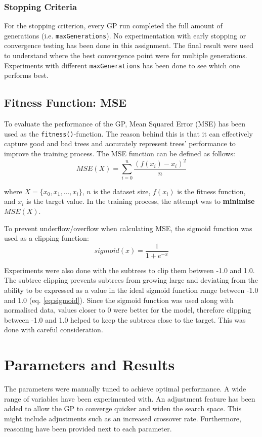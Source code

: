 \documentclass{article}
\begin{document}
\subsubsection{Stopping Criteria}
For the stopping criterion, every GP run completed the full amount of generations (i.e. \texttt{maxGenerations}). No experimentation with early stopping or convergence testing has been done in this assignment. The final result were used to understand where the best convergence point were for multiple generations. Experiments with different \texttt{maxGenerations} has been done to see which one performs best.

\subsection{Fitness Function: MSE}
\label{fitness}
To evaluate the performance of the GP, Mean Squared Error (MSE) has been used as the \texttt{fitness()}-function. The reason behind this is that it can effectively capture good and bad trees and accurately represent trees' performance to improve the training process. The MSE function can be defined as follows:
\begin{equation}\label{mse}
  MSE(X) = \sum_{i=0}^{n} \frac{(f(x_i) - x_i)^2}{n}
\end{equation}

where \(X = \{x_0, x_1, ... , x_i\}\), \(n\) is the dataset size, \(f(x_i)\) is the fitness function, and \(x_i\) is the target value. In the training process, the attempt was to \textbf{minimise} \(MSE(X)\).

To prevent underflow/overflow when calculating MSE, the sigmoid function was used as a clipping function:
\begin{equation}\label{eq:sigmoid}
  sigmoid(x) = \frac{1}{1 + e^{-x}}
\end{equation}

Experiments were also done with the subtrees to clip them between -1.0 and 1.0. The subtree clipping prevents subtrees from growing large and deviating from the ability to be expressed as a value in the ideal sigmoid function range between -1.0 and 1.0 (eq. \ref{eq:sigmoid}). Since the sigmoid function was used along with normalised data, values closer to 0 were better for the model, therefore clipping between -1.0 and 1.0 helped to keep the subtrees close to the target. This was done with careful consideration.

\section{Parameters and Results}
\label{GPsetup}
The parameters were manually tuned to achieve optimal performance. A wide range of variables have been experimented with. An adjustment feature has been added to allow the GP to converge quicker and widen the search space. This might include adjustments such as an increased crossover rate. Furthermore, reasoning have been provided next to each parameter.
\end{document}
